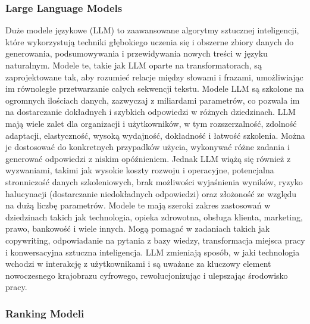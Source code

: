 \subsubsection{Large Language Models}
Duże modele językowe (LLM) to zaawansowane algorytmy sztucznej inteligencji, które wykorzystują techniki głębokiego uczenia się i obszerne zbiory danych do generowania, podsumowywania i przewidywania nowych treści w języku naturalnym. Modele te, takie jak LLM oparte na transformatorach, są zaprojektowane tak, aby rozumieć relacje między słowami i frazami, umożliwiając im równoległe przetwarzanie całych sekwencji tekstu. Modele LLM są szkolone na ogromnych ilościach danych, zazwyczaj z miliardami parametrów, co pozwala im na dostarczanie dokładnych i szybkich odpowiedzi w różnych dziedzinach. LLM mają wiele zalet dla organizacji i użytkowników, w tym rozszerzalność, zdolność adaptacji, elastyczność, wysoką wydajność, dokładność i łatwość szkolenia. Można je dostosować do konkretnych przypadków użycia, wykonywać różne zadania i generować odpowiedzi z niskim opóźnieniem. Jednak LLM wiążą się również z wyzwaniami, takimi jak wysokie koszty rozwoju i operacyjne, potencjalna stronniczość danych szkoleniowych, brak możliwości wyjaśnienia wyników, ryzyko halucynacji (dostarczanie niedokładnych odpowiedzi) oraz złożoność ze względu na dużą liczbę parametrów. Modele te mają szeroki zakres zastosowań w dziedzinach takich jak technologia, opieka zdrowotna, obsługa klienta, marketing, prawo, bankowość i wiele innych. Mogą pomagać w zadaniach takich jak copywriting, odpowiadanie na pytania z bazy wiedzy, transformacja miejsca pracy i konwersacyjna sztuczna inteligencja. LLM zmieniają sposób, w jaki technologia wchodzi w interakcję z użytkownikami i są uważane za kluczowy element nowoczesnego krajobrazu cyfrowego, rewolucjonizując i ulepszając środowisko pracy.

\subsubsection{Ranking Modeli}

